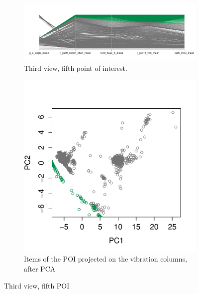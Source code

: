 \begin{figure}[t!]
        \centering
        \begin{subfigure}[b]{0.75\textwidth}
                \includegraphics[width=\textwidth]{images/vibration_group_2}
                \caption{Third view, fifth point of interest.}
                \label{fig:vibration_group_1}
        \end{subfigure}%
        \begin{subfigure}[b]{0.25\textwidth}
                \includegraphics[width=\textwidth]{images/vibration_target_2}
                \caption{Items of the POI projected on the vibration columns,
                after PCA}
                \label{fig:/vibration_target_2}
        \end{subfigure}
        \caption{Third view, fifth POI}\label{fig:vibra-group2}
\end{figure}

